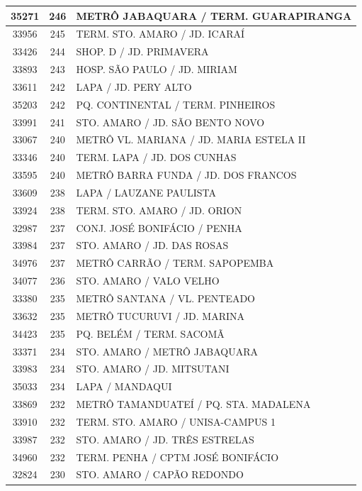 \documentclass[
	12pt,				%
	oneside,			%
	a4paper,			%
	english,			%
	brazil				%
	]{abntex2ppgsi}
\begin{document}
{{{\begin{apendicesenv}
\begin{longtable}{c|c|p{7cm}}
 \hline 
35271 &	246 &	METRÔ JABAQUARA / TERM. GUARAPIRANGA \\ 
 \hline 
33956 &	245 &	TERM. STO. AMARO / JD. ICARAÍ \\ 
 \hline 
33426 &	244 &	SHOP. D / JD. PRIMAVERA \\ 
 \hline 
33893 &	243 &	HOSP. SÃO PAULO / JD. MIRIAM \\ 
 \hline 
33611 &	242 &	LAPA / JD. PERY ALTO \\ 
 \hline 
35203 &	242 &	PQ. CONTINENTAL / TERM. PINHEIROS \\ 
 \hline 
33991 &	241 &	STO. AMARO / JD. SÃO BENTO NOVO \\ 
 \hline 
33067 &	240 &	METRÔ VL. MARIANA / JD. MARIA ESTELA II \\ 
 \hline 
33346 &	240 &	TERM. LAPA / JD. DOS CUNHAS \\ 
 \hline 
33595 &	240 &	METRÔ BARRA FUNDA / JD. DOS FRANCOS \\ 
 \hline 
33609 &	238 &	LAPA / LAUZANE PAULISTA \\ 
 \hline 
33924 &	238 &	TERM. STO. AMARO / JD. ORION \\ 
 \hline 
32987 &	237 &	CONJ. JOSÉ BONIFÁCIO / PENHA \\ 
 \hline 
33984 &	237 &	STO. AMARO / JD. DAS ROSAS \\ 
 \hline 
34976 &	237 &	METRÔ CARRÃO / TERM. SAPOPEMBA \\ 
 \hline 
34077 &	236 &	STO. AMARO / VALO VELHO \\ 
 \hline 
33380 &	235 &	METRÔ SANTANA / VL. PENTEADO \\ 
 \hline 
33632 &	235 &	METRÔ TUCURUVI / JD. MARINA \\ 
 \hline 
34423 &	235 &	PQ. BELÉM / TERM. SACOMÃ \\ 
 \hline 
33371 &	234 &	STO. AMARO / METRÔ JABAQUARA \\ 
 \hline 
33983 &	234 &	STO. AMARO / JD. MITSUTANI \\ 
 \hline 
35033 &	234 &	LAPA / MANDAQUI \\ 
 \hline 
33869 &	232 &	METRÔ TAMANDUATEÍ / PQ. STA. MADALENA \\ 
 \hline 
33910 &	232 &	TERM. STO. AMARO / UNISA-CAMPUS 1 \\ 
 \hline 
33987 &	232 &	STO. AMARO / JD. TRÊS ESTRELAS \\ 
 \hline 
34960 &	232 &	TERM. PENHA / CPTM JOSÉ BONIFÁCIO \\ 
 \hline 
32824 &	230 &	STO. AMARO / CAPÃO REDONDO \\ 

\end{longtable}
\end{apendicesenv}}}}
\end{document}
